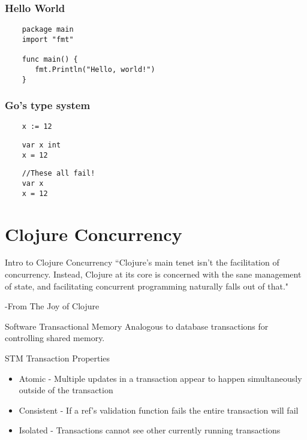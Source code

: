 \documentclass[xcolor=dvipsnames]{beamer}
\begin{document}
	\begin{frame}[fragile]
	\frametitle{Hello World}
    \begin{verbatim}
    package main
    import "fmt"
    
    func main() {
       fmt.Println("Hello, world!")
    }
    \end{verbatim}
	\end{frame}
	
	\begin{frame}[fragile]
	\frametitle{Go's type system}
	\begin{verbatim}
	x := 12
	\end{verbatim}
	\pause
	\begin{verbatim}
	var x int
	x = 12
	\end{verbatim}
	\pause
	\begin{verbatim}
	//These all fail!	
	var x
	x = 12
	\end{verbatim}
	\end{frame}
    
    
	
	\section{Clojure Concurrency}
		\begin{frame}{Intro to Clojure Concurrency}
		``Clojure's main tenet isn't the facilitation of concurrency. Instead, Clojure at its core is concerned with the sane management of state, and facilitating concurrent programming naturally falls out of that."
		
		\hspace{10 mm}-From The Joy of Clojure
		\end{frame}
		
		\begin{frame}{Software Transactional Memory}
			Analogous to database transactions for controlling shared memory.
			\begin{block}{STM Transaction Properties}
			\begin{itemize}
			\item Atomic - Multiple updates in a transaction appear to happen simultaneously outside of the transaction
			\item Consistent - If a ref's validation function fails the entire transaction will fail
			\item Isolated - Transactions cannot see other currently running transactions
			\end{itemize}
			\end{block}
		\end{frame}			
			
\end{document}
